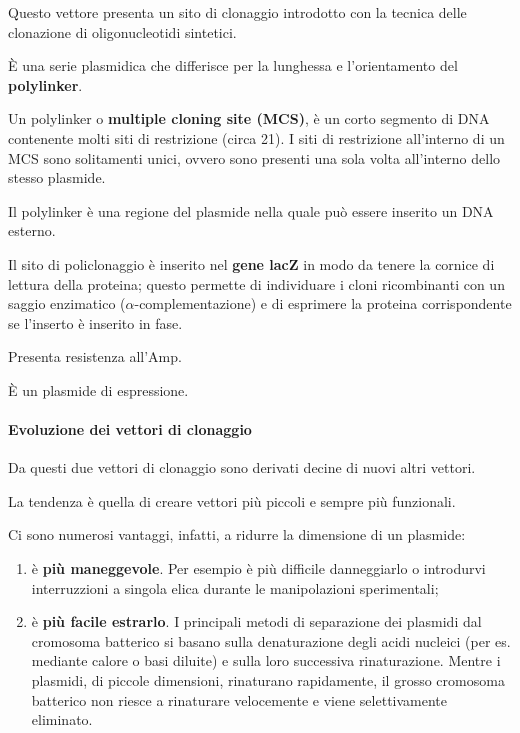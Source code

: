 \documentclass[]{article}
\begin{document}
Questo vettore presenta un sito di clonaggio introdotto con la tecnica
delle clonazione di oligonucleotidi sintetici.

È una serie plasmidica che differisce per la lunghessa e l'orientamento
del \textbf{polylinker}.

Un polylinker o \textbf{multiple cloning site (MCS)}, è un corto
segmento di DNA contenente molti siti di restrizione (circa 21). I siti
di restrizione all'interno di un MCS sono solitamenti unici, ovvero sono
presenti una sola volta all'interno dello stesso plasmide.

Il polylinker è una regione del plasmide nella quale può essere inserito
un DNA esterno.

Il sito di policlonaggio è inserito nel \textbf{gene lacZ} in modo da
tenere la cornice di lettura della proteina; questo permette di
individuare i cloni ricombinanti con un saggio enzimatico
(\(\alpha\)-complementazione) e di esprimere la proteina corrispondente
se l'inserto è inserito in fase.

Presenta resistenza all'Amp.

È un plasmide di espressione.

\paragraph{Evoluzione dei vettori di
clonaggio}\label{evoluzione-dei-vettori-di-clonaggio}

Da questi due vettori di clonaggio sono derivati decine di nuovi altri
vettori.

La tendenza è quella di creare vettori più piccoli e sempre più
funzionali.

Ci sono numerosi vantaggi, infatti, a ridurre la dimensione di un
plasmide:

\begin{enumerate}
\def\labelenumi{\arabic{enumi}.}
\itemsep1pt\parskip0pt
\item
  è \textbf{più maneggevole}. Per esempio è più difficile danneggiarlo o
  introdurvi interruzzioni a singola elica durante le manipolazioni
  sperimentali;
\item
  è \textbf{più facile estrarlo}. I principali metodi di separazione dei
  plasmidi dal cromosoma batterico si basano sulla denaturazione degli
  acidi nucleici (per es. mediante calore o basi diluite) e sulla loro
  successiva rinaturazione. Mentre i plasmidi, di piccole dimensioni,
  rinaturano rapidamente, il grosso cromosoma batterico non riesce a
  rinaturare velocemente e viene selettivamente eliminato.
\end{enumerate}
\end{document}
